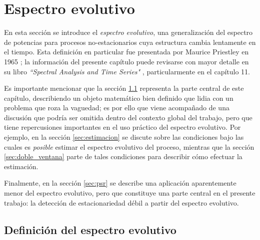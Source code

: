 
\chapter{Espectro evolutivo}
\label{capitulo:espectro_evo}

En esta sección se introduce el \textit{espectro evolutivo}, una generalización del espectro de potencias para procesos no-estacionarios cuya estructura cambia lentamente en el tiempo.
%
Esta definición en particular fue presentada por Maurice Priestley en 1965 \cite{Priestley65}; la información del presente capítulo puede revisarse con mayor detalle en su libro \textit{``Spectral Analysis and Time Series"} \cite{Priestley81}, particularmente en el capítulo 11.

Es importante mencionar que la sección \ref{sec:espectro} representa la parte central de este capítulo, describiendo un objeto matemático bien definido que lidia con un problema que roza la vaguedad; es por ello que viene acompañado de una discusión que podría ser omitida dentro del contexto global del trabajo, pero que tiene repercusiones importantes en el uso práctico del espectro evolutivo.
%
Por ejemplo, en la sección \ref{sec:estimacion} se discute sobre las condiciones bajo las cuales es \textit{posible} estimar el espectro evolutivo del proceso, mientras que la sección \ref{sec:doble_ventana} parte de tales condiciones para describir cómo efectuar la estimación.

Finalmente, en la sección \ref{sec:psr} se describe una aplicación aparentemente menor del espectro evolutivo, pero que constituye una parte central en el presente trabajo: la detección de estacionariedad débil a partir del espectro evolutivo.


\section{Definición del espectro evolutivo}
\label{sec:espectro}

